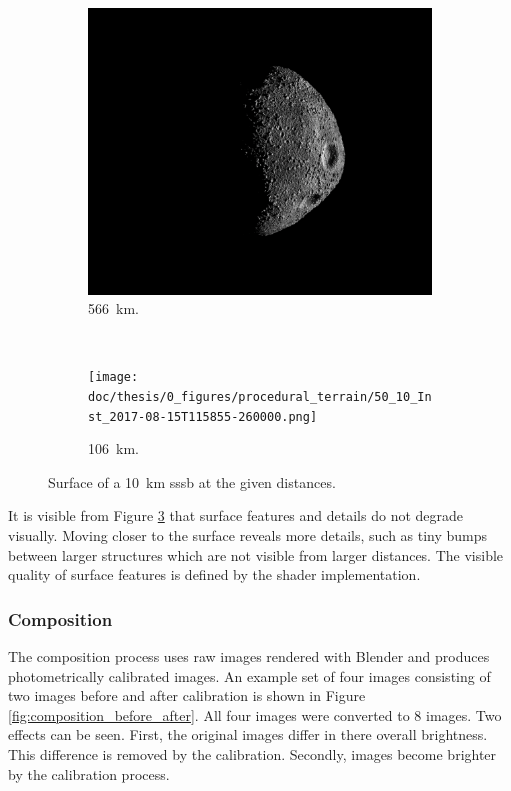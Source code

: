 \begin{figure}[htb]
    \centering
        \begin{subfigure}[b]{0.75\textwidth}
            \centering
            \includegraphics[width=\textwidth]{doc/thesis/0_figures/procedural_terrain/50_10_Inst_2017-08-15T115755-845000.png}
            \caption{\SI{566}{\kilo\meter}.}
            \label{fig:img_procedural_500}
        \end{subfigure}
        \\
        \begin{subfigure}[b]{0.75\textwidth}
            \centering
            \texttt{[image: doc/thesis/0\_figures/procedural\_terrain/50\_10\_Inst\_2017-08-15T115855-260000.png]}
            \caption{\SI{106}{\kilo\meter}.}
            \label{fig:img_procedural_100}
        \end{subfigure}
    \caption{Surface of a \SI{10}{\kilo\meter} \gls{sssb} at the given distances.}
    \label{fig:img_procedural_10k}
\end{figure}

It is visible from Figure \ref{fig:img_procedural_10k} that surface features and details do not degrade visually. Moving closer to the surface reveals more details, such as tiny bumps between larger structures which are not visible from larger distances. The visible quality of surface features is defined by the shader implementation. 

\subsubsection{Composition}
The composition process uses raw images rendered with Blender and produces photometrically calibrated images. An example set of four images consisting of two images before and after calibration is shown in Figure \ref{fig:composition_before_after}. All four images were converted to \SI{8}{\bit} images. Two effects can be seen. First, the original images differ in there overall brightness. This difference is removed by the calibration. Secondly, images become brighter by the calibration process. 

